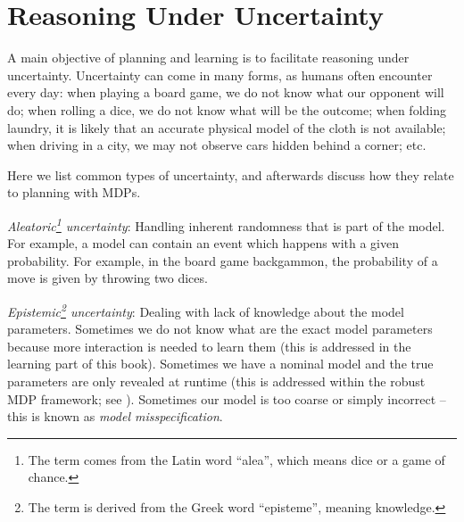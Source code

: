 
\section{Reasoning Under Uncertainty}

A main objective of planning and learning is to facilitate reasoning under uncertainty. Uncertainty can come in many forms, as humans often encounter every day: when playing a board game, we do not know what our opponent will do; when rolling a dice, we do not know what will be the outcome; when folding laundry, it is likely that an accurate physical model of the cloth is not available; when driving in a city, we may not observe cars hidden behind a corner; etc. 




Here we list common types of uncertainty, and afterwards discuss how they relate to planning with MDPs. 

    {\em Aleatoric\footnote{The term comes from the Latin word ``alea'', which means dice or a game of chance.} uncertainty}: Handling inherent randomness that is part of the model. For example, a model can contain an event which happens with a given probability. For example, in the board game backgammon, the probability of a move is given by throwing two dices.
    
    {\em Epistemic\footnote{The term is derived from the Greek word ``episteme'', meaning knowledge.} uncertainty}: Dealing with lack of knowledge about the model parameters. Sometimes we do not know what are the exact model parameters because more interaction is needed to learn them (this is addressed in the learning part of this book). Sometimes we have a nominal model and the true parameters are only  revealed at runtime (this is addressed within the robust MDP framework; see \cite{nilim2005robust}). Sometimes our model is too coarse or simply incorrect -- this is known as {\em model misspecification}.
    
    
